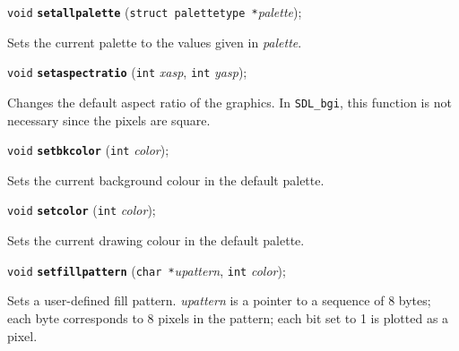 \documentclass[a4paper,12pt]{article}
\newcommand{\SDLbgi}{\texttt{SDL\_bgi}}
\newcommand{\V}{\texttt{void}}      %
\newcommand{\I}{\texttt{int}}       %
\newcommand{\C}{\texttt{char *}}    %
\newcommand{\func}[1]{\textbf{\texttt{#1}}}  %
\newcommand{\A}[1]{\emph{#1}}       %
\newenvironment{bgi}
{ %
  \begin{snugshade}
}
{ %
  \end{snugshade}
}
\begin{document}

\label{sec:setallpalette}

\begin{bgi}
\V{} \func{setallpalette} (\texttt{struct palettetype *}\A{palette});
\end{bgi}

Sets the current palette to the values given in \A{palette}.


\label{sec:setaspectratio}

\begin{bgi}
\V{} \func{setaspectratio} (\I{} \A{xasp}, \I{} \A{yasp});
\end{bgi}

Changes the default aspect ratio of the graphics. In \SDLbgi, this
function is not necessary since the pixels are square.


\label{sec:setbkcolor}

\begin{bgi}
\V{} \func{setbkcolor} (\I{} \A{color});
\end{bgi}

Sets the current background colour in the default palette.


\label{sec:setcolor}

\begin{bgi}
\V{} \func{setcolor} (\I{} \A{color});
\end{bgi}

Sets the current drawing colour in the default palette.


\label{sec:setfillpattern}

\begin{bgi}
\V{} \func{setfillpattern} (\C{}\A{upattern}, \I{} \A{color});
\end{bgi}

Sets a user-defined fill pattern. \A{upattern} is a pointer to a
sequence of 8 bytes; each byte corresponds to 8 pixels in the pattern;
each bit set to 1 is plotted as a pixel.
\end{document}

